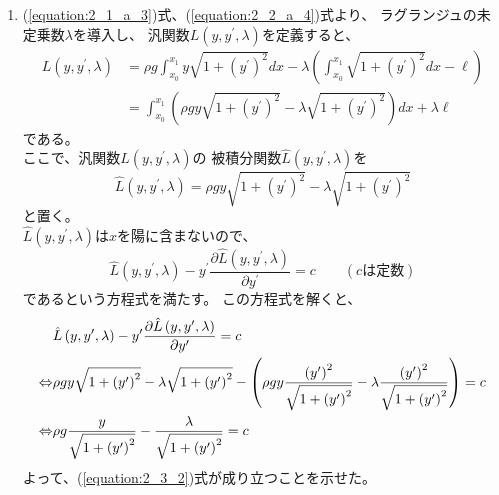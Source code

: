 \begin{enumerate}
  \item (\ref{equation:2_1_a_3})式、(\ref{equation:2_2_a_4})式より、
  ラグランジュの未定乗数\(\lambda\)を導入し、
  汎関数\(L \left(y, y^{\prime}, \lambda\right)\)を定義すると、
  \begin{equation}
    \begin{split}
      L \left(y, y^{\prime}, \lambda\right)
      &= \rho g \int^{x_1}_{x_0} y \sqrt{1 + \left(y^{\prime}\right)^2} dx -
      \lambda \left(\int^{x_{1}}_{x_{0}} \sqrt{1 + \left(y^{\prime}\right)^{2}} dx - \ell\right) \\
      &= \int^{x_1}_{x_0} \left(\rho g y \sqrt{1 + \left(y^{\prime}\right)^2} -
      \lambda \sqrt{1 + \left(y^{\prime}\right)^{2}}\right) dx + \lambda \ell
    \end{split}
  \end{equation}
  である。\\
  ここで、汎関数\(L \left(y, y^{\prime}, \lambda\right)\)の
  被積分関数\(\hat{L} \left(y, y^{\prime}, \lambda\right)\)を
  \begin{equation}
    \hat{L} \left(y, y^{\prime}, \lambda\right) =
    \rho g y \sqrt{1 + \left(y^{\prime}\right)^2} -
    \lambda \sqrt{1 + \left(y^{\prime}\right)^{2}}
  \end{equation}
  と置く。\\
  \(\hat{L} \left(y, y^{\prime}, \lambda\right)\)は\(x\)を陽に含まないので、
  \begin{equation}
    \hat{L} \left(y, y^{\prime}, \lambda\right) - y^{\prime} \frac{\partial \hat{L} \left(y, y^{\prime}, \lambda\right)}{\partial y^{\prime}} = c
    \quad\quad\left(c は定数\right)
  \end{equation}
  であるという方程式を満たす。
  この方程式を解くと、
  \begin{align}
      & \hat{L} \left(y, y^{\prime}, \lambda\right) - y^{\prime} \frac{\partial \hat{L} \left(y, y^{\prime}, \lambda\right)}{\partial y^{\prime}} = c \notag\\
      \Leftrightarrow & \rho g y \sqrt{1 + \left(y^{\prime}\right)^2} - \lambda \sqrt{1 + \left(y^{\prime}\right)^{2}}
      - \left(\rho g y \frac{\left(y^{\prime}\right)^2}{\sqrt{1 + \left(y^{\prime}\right)^2}} - \lambda \frac{\left(y^{\prime}\right)^2}{\sqrt{1 + \left(y^{\prime}\right)^2}}\right) = c \notag\\
      \Leftrightarrow & \rho g \frac{y}{\sqrt{1 + \left(y^{\prime}\right)^2}} - \frac{\lambda}{\sqrt{1 + \left(y^{\prime}\right)^2}} = c
  \end{align}
  よって、(\ref{equation:2_3_2})式が成り立つことを示せた。

\end{enumerate}
